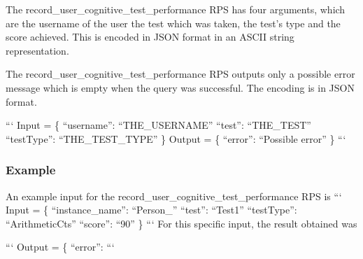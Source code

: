The record\-\_\-user\-\_\-cognitive\-\_\-test\-\_\-performance R\-P\-S has four arguments, which are the username of the user the test which was taken, the test’s type and the score achieved. This is encoded in J\-S\-O\-N format in an A\-S\-C\-I\-I string representation.

The record\-\_\-user\-\_\-cognitive\-\_\-test\-\_\-performance R\-P\-S outputs only a possible error message which is empty when the query was successful. The encoding is in J\-S\-O\-N format.

``` Input = \{ “username”\-: “\-T\-H\-E\-\_\-\-U\-S\-E\-R\-N\-A\-M\-E” “test”\-: “\-T\-H\-E\-\_\-\-T\-E\-S\-T” “test\-Type”\-: “\-T\-H\-E\-\_\-\-T\-E\-S\-T\-\_\-\-T\-Y\-P\-E” \} {\ttfamily  } Output = \{ “error”\-: “\-Possible error” \} ```

\subsubsection*{Example}

An example input for the record\-\_\-user\-\_\-cognitive\-\_\-test\-\_\-performance R\-P\-S is ``` Input = \{ “instance\-\_\-name”\-: “\-Person\-\_” “test”\-: “\-Test1” “test\-Type”\-: “\-Arithmetic\-Cts” “score”\-: “90” \} ``` For this specific input, the result obtained was

``` Output = \{ “error”\-: ``` 